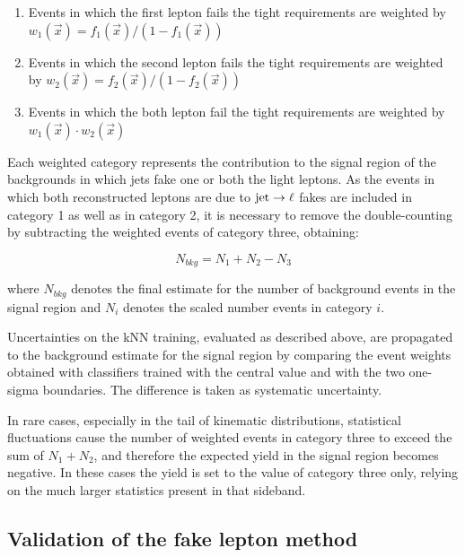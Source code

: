 \begin{enumerate}
\item Events in which the first lepton fails the tight requirements are weighted by $w_1(\vec{x}) = f_1(\vec{x})/(1-f_1(\vec{x}))$
\item Events in which the second lepton fails the tight requirements are weighted by $w_2(\vec{x}) = f_2(\vec{x})/(1-f_2(\vec{x}))$
\item Events in which the both lepton fail the tight requirements are weighted by $w_1(\vec{x}) \cdot w_2(\vec{x})$
\end{enumerate}

Each weighted category represents the contribution to the signal region of the backgrounds in which jets fake one or both the light leptons. As the events 
in which both reconstructed leptons are due to $\mathrm{jet}\rightarrow\ell$ fakes %
are included in category 1 as well as in category 2, it is necessary to remove the double-counting by subtracting the weighted events of category three, obtaining:

\begin{equation}
N_{bkg} = N_1 + N_2 - N_3
\end{equation}

where $N_{bkg}$ denotes the final estimate for the number of background events in the signal region and $N_i$ denotes the scaled number events in category $i$.

Uncertainties on the kNN training, evaluated as described above, are propagated to the background estimate for the signal region by comparing %
the event weights obtained with classifiers trained with the central value and with the two one-sigma boundaries. The difference is taken as systematic uncertainty.

In rare cases, especially in the tail of kinematic distributions, statistical fluctuations cause the number of weighted events in category three to exceed the sum of $N_1 + N_2$, %
and therefore the expected yield in the signal region becomes negative. In these cases the yield is set to the value of category three only, relying on the much larger statistics present in that sideband.


%

\subsection{Validation of the fake lepton method}
\label{sec:f3_validation}

